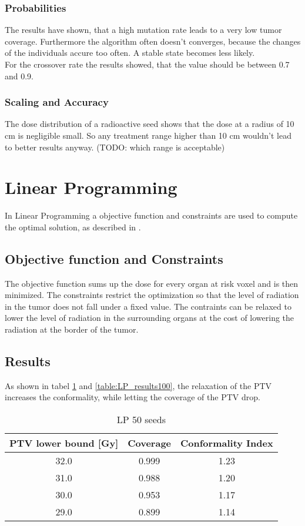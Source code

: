 \documentclass[USenglish,twocolumn]{article}
\begin{document}
\subsubsection{Probabilities} 
The results have shown, that a high mutation rate leads to a very low tumor coverage. Furthermore the algorithm often doesn't converges, because the changes of the individuals accure too often. A stable state becomes less likely. \\ For the crossover rate the results showed, that the value should be between 0.7 and 0.9.

\subsubsection{Scaling and Accuracy}
The dose distribution of a radioactive seed shows that the dose at a radius of 10 cm is negligible small. So any treatment range higher than 10 cm wouldn't lead to better results anyway. (TODO: which range is acceptable)

\section{Linear Programming}
In Linear Programming a objective function and constraints are used to compute the optimal solution, as described in \citep{2}.

\subsection{Objective function and Constraints}
The objective function sums up the dose for every organ at risk voxel and is then minimized. The constraints restrict the optimization so that the level of radiation in the tumor does not fall under a fixed value. The contraints can be relaxed to lower the level of radiation in the surrounding organs at the cost of lowering the radiation at the border of the tumor.

\subsection{Results}
As shown in tabel \ref{table:LP_results50} and \ref{table:LP_results100}, the relaxation of the PTV increases the conformality, while letting the coverage of the PTV drop. 
		\begin{table}[h]
			\centering		
		 	\caption{LP 50 seeds}
		 	\label{table:LP_results50}
			\begin{tabular}{ccc}
			PTV lower bound [Gy] 	& Coverage 	& Conformality Index\\	\hline
				32.0 	& 0.999		& 1.23\\
				31.0 	& 0.988 	& 1.20\\
				30.0 	& 0.953		& 1.17\\		
				29.0 	& 0.899		& 1.14\\
			\end{tabular}
		\end{table}
		
\end{document}
